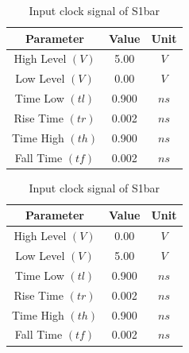 \documentclass[a4paper,12pt]{article}
\begin{document}
\begin{table}[H]
\begin{subtable}[t]{0.48\textwidth}
			\caption{Input clock signal of S0bar} %
		\end{subtable}
			\begin{subtable}[t]{0.48\textwidth} %
			\centering
			\begin{tabular}{|c|c|c|}
				\hline
				\textbf{Parameter}          & \textbf{Value} & \textbf{Unit} \\ \hline
				High Level $(V)$            & 5.00           & $V$           \\ \hline
				Low Level $(V)$             & 0.00           & $V$           \\ \hline
				Time Low $(tl)$             & 0.900         & $ns$          \\ \hline
				Rise Time $(tr)$            & 0.002          & $ns$          \\ \hline
				Time High $(th)$            & 0.900          & $ns$          \\ \hline
				Fall Time $(tf)$            & 0.002          & $ns$          \\ \hline
			\end{tabular}
			
			\caption{Input clock signal of S1} %
		\end{subtable}
		\hfil
		\begin{subtable}[t]{0.48\textwidth} %
			\centering
			\begin{tabular}{|c|c|c|}
				\hline
				\textbf{Parameter}          & \textbf{Value} & \textbf{Unit} \\ \hline
				High Level $(V)$            & 0.00           & $V$           \\ \hline
				Low Level $(V)$             & 5.00           & $V$           \\ \hline
				Time Low $(tl)$             & 0.900          & $ns$          \\ \hline
				Rise Time $(tr)$            & 0.002          & $ns$          \\ \hline
				Time High $(th)$            & 0.900         & $ns$          \\ \hline
				Fall Time $(tf)$            & 0.002          & $ns$          \\ \hline
			\end{tabular}
			
			\caption{Input clock signal of S1bar} %
		\end{subtable}
	\end{table}
	
\end{document}
